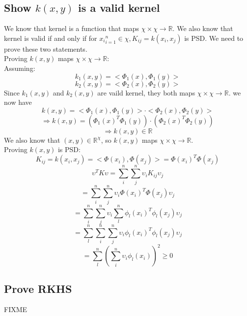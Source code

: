 \documentclass[twoside]{article}
\theoremstyle{definition}
\theoremstyle{definition}
\theoremstyle{remark}
\def\R{{\mathbb R}}
\begin{document}
\subsection{Show $k(x,y)$ is a valid kernel}
We know that kernel is a function that maps $\chi \times \chi \rightarrow \R$. 
We also know that kernel is valid if and only if for ${x_i}_{i=1}^n \in \chi, K_{ij} = k(x_i,x_j)$ is PSD. We need to prove these two statements.\\ 
Proving $k(x,y)$ maps $\chi \times \chi \rightarrow \R$:\\ 
Assuming:
\[k_1(x,y) = <\Phi_1(x),\Phi_1(y)>\]
\[k_2(x,y) = <\Phi_2(x),\Phi_2(y)>\]
Since $k_1(x,y)$ and $k_2(x,y)$ are vaild kernel, they both maps $\chi \times \chi \rightarrow \R$. 
we now have 
\[k(x,y) = <\Phi_1(x),\Phi_1(y)>\cdot <\Phi_2(x),\Phi_2(y)>\]
\[\Rightarrow k(x,y) = (\Phi_1(x)^T \Phi_1(y))\cdot(\Phi_2(x)^T\Phi_2(y))\]
\[\Rightarrow k(x,y) \in \R\]
We also know that $(x,y) \in \R^\chi$, so $k(x,y)$ maps $\chi \times \chi \rightarrow \R$.\\
Proving $k(x,y)$ is PSD:
\[K_{ij} = k(x_i,x_j) =  <\Phi(x_i),\Phi(x_j)> =\Phi(x_i)^T\Phi(x_j) \]
\[\upsilon^T K \upsilon = \sum_i^n \sum_j^n \upsilon_i K_{ij} \upsilon_j\]
\[=\sum_i^n \sum_j^n \upsilon_i \Phi(x_i)^T\Phi(x_j) \upsilon_j\]
\[=\sum_i^n \sum_j^n \upsilon_i \sum_l^n \phi_l(x_i)^T\phi_l(x_j) \upsilon_j\]
\[=\sum_l^n \sum_i^n \sum_j^n \upsilon_i \phi_l(x_i)^T\phi_l(x_j) \upsilon_j\]
\[=\sum_l^n(\sum_i^n \upsilon_i \phi_l(x_i))^2 \geq 0\]
\subsection{Prove RKHS}
FIXME
\end{document}
